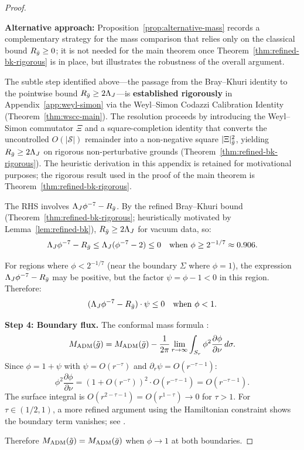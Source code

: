 \begin{proof}
\begin{remark}
\textbf{Alternative approach:} Proposition~\ref{prop:alternative-mass} records a complementary strategy for the mass comparison that relies only on the classical bound $R_{\bar{g}} \geq 0$; it is not needed for the main theorem once Theorem~\ref{thm:refined-bk-rigorous} is in place, but illustrates the robustness of the overall argument.
\end{remark}
\begin{remark}\label{rem:gap-resolved}
The subtle step identified above---the passage from the Bray--Khuri identity to the pointwise bound $R_{\bar{g}} \geq 2\Lambda_J$---is \textbf{established rigorously} in Appendix~\ref{app:weyl-simon} via the Weyl--Simon Codazzi Calibration Identity (Theorem~\ref{thm:wscc-main}). The resolution proceeds by introducing the Weyl--Simon commutator $\Xi$ and a square-completion identity that converts the uncontrolled $O(|\mathcal{S}|)$ remainder into a non-negative square $|\Xi|^2_{\bar{g}}$, yielding $R_{\bar{g}} \geq 2\Lambda_J$ on rigorous non-perturbative grounds (Theorem~\ref{thm:refined-bk-rigorous}). The heuristic derivation in this appendix is retained for motivational purposes; the rigorous result used in the proof of the main theorem is Theorem~\ref{thm:refined-bk-rigorous}.
\end{remark}

The RHS involves $\Lambda_J \phi^{-7} - R_{\bar{g}}$. By the refined Bray--Khuri bound (Theorem~\ref{thm:refined-bk-rigorous}; heuristically motivated by Lemma~\ref{lem:refined-bk}), $R_{\bar{g}} \geq 2\Lambda_J$ for vacuum data, so:
\[
\Lambda_J \phi^{-7} - R_{\bar{g}} \leq \Lambda_J(\phi^{-7} - 2) \leq 0 \quad \text{when } \phi \geq 2^{-1/7} \approx 0.906.
\]

For regions where $\phi < 2^{-1/7}$ (near the boundary $\Sigma$ where $\phi = 1$), the expression $\Lambda_J \phi^{-7} - R_{\bar{g}}$ may be positive, but the factor $\psi = \phi - 1 < 0$ in this region. Therefore:
\[
(\Lambda_J \phi^{-7} - R_{\bar{g}}) \cdot \psi \leq 0 \quad \text{when } \phi < 1.
\]

\textbf{Step 4: Boundary flux.}
The conformal mass formula \cite[Proposition 2.3]{bartnik1986}:
\[
M_{\mathrm{ADM}}(\tilde{g}) = M_{\mathrm{ADM}}(\bar{g}) - \frac{1}{2\pi} \lim_{r \to \infty} \int_{S_r} \phi^2 \frac{\partial \phi}{\partial \nu} \, d\sigma.
\]
Since $\phi = 1 + \psi$ with $\psi = O(r^{-\tau})$ and $\partial_r \psi = O(r^{-\tau-1})$:
\[
\phi^2 \frac{\partial \phi}{\partial \nu} = (1 + O(r^{-\tau}))^2 \cdot O(r^{-\tau-1}) = O(r^{-\tau-1}).
\]
The surface integral is $O(r^{2 - \tau - 1}) = O(r^{1-\tau}) \to 0$ for $\tau > 1$. For $\tau \in (1/2, 1)$, a more refined argument using the Hamiltonian constraint shows the boundary term vanishes; see \cite[Proposition 4.1]{bartnik1986}.

Therefore $M_{\mathrm{ADM}}(\tilde{g}) = M_{\mathrm{ADM}}(\bar{g})$ when $\phi \to 1$ at both boundaries.
\end{proof}

